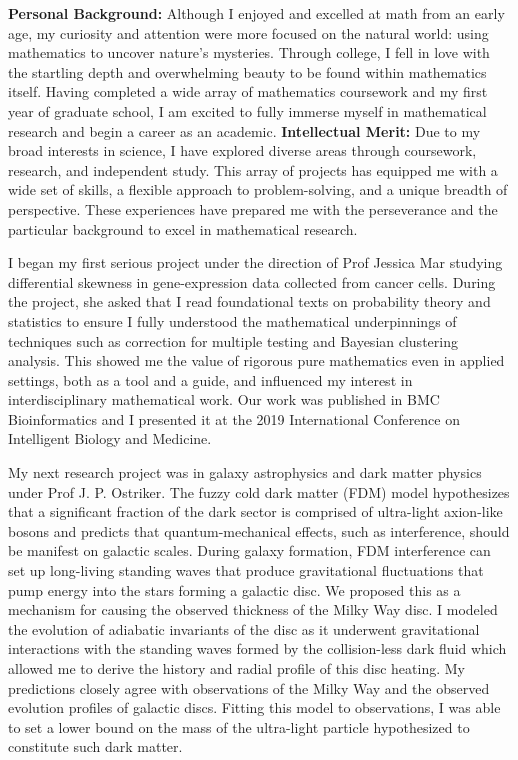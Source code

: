 \documentclass[11pt]{article}
\begin{document}
\pagestyle{empty}
\fontsize{11.1}{12.1}\selectfont %
\noindent
\textbf{Personal Background:} Although I enjoyed and excelled at math from an early age, my curiosity and attention were more focused on the natural world: using mathematics to uncover nature's mysteries. Through college, I fell in love with the startling depth and overwhelming beauty to be found within mathematics itself. Having completed a wide array of mathematics coursework and my first year of graduate school, I am excited to fully immerse myself in mathematical research and begin a career as an academic.
\newline
\noindent
\textbf{Intellectual Merit:} Due to my broad interests in science, I have explored diverse areas through
coursework, research, and independent study. This array of projects has equipped me with a wide set of skills, a flexible approach to problem-solving, and a unique breadth of perspective. These experiences have prepared me with the perseverance and the particular background to excel in mathematical research. 
\par
I began my first serious project under the direction of Prof Jessica Mar studying differential skewness in gene-expression data collected from cancer cells. During the project, she asked that I read foundational texts on probability theory and statistics to ensure I fully understood the mathematical
underpinnings of techniques such as correction for multiple testing and Bayesian clustering analysis. This showed me the value of rigorous pure mathematics even in applied settings, both as a tool and a guide, and influenced my interest in interdisciplinary mathematical work. Our work was published in BMC Bioinformatics and I presented it at the 2019 International Conference on Intelligent Biology and Medicine.
\par 
My next research project was in galaxy astrophysics and dark matter physics under Prof J. P. Ostriker. The fuzzy cold dark matter (FDM) model hypothesizes that a significant fraction of the dark sector is comprised of ultra-light axion-like bosons and predicts that quantum-mechanical effects, such as interference, should be manifest on galactic scales. During galaxy formation, FDM interference can set up
long-living standing waves that produce gravitational fluctuations that pump energy into the stars forming a galactic disc. We proposed this as a mechanism for causing the observed thickness of the Milky Way disc. I modeled the evolution of adiabatic invariants of the disc as it underwent gravitational interactions with the standing waves formed by the collision-less dark fluid which allowed me to derive the history and radial profile of this disc heating. My predictions closely agree with observations of the Milky Way and the observed evolution profiles of galactic discs. Fitting this model to observations, I was able to set a lower bound on the mass of the ultra-light particle hypothesized to constitute such dark matter.
\end{document}

